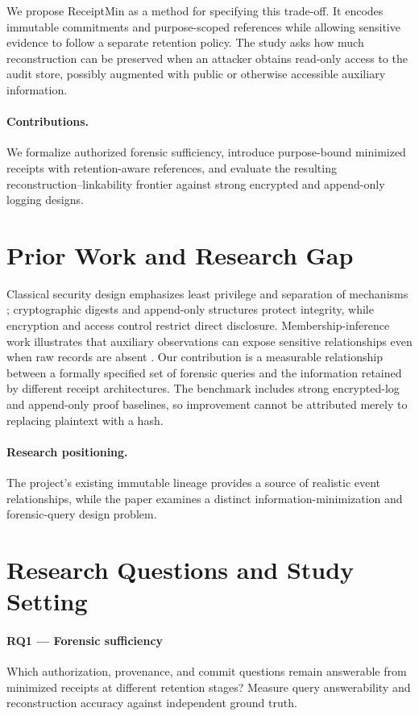 \documentclass[11pt,a4paper]{article}
\begin{document}
We propose ReceiptMin as a method for specifying this trade-off. It encodes immutable commitments and purpose-scoped references while allowing sensitive evidence to follow a separate retention policy. The study asks how much reconstruction can be preserved when an attacker obtains read-only access to the audit store, possibly augmented with public or otherwise accessible auxiliary information.

\paragraph{Contributions.} We formalize authorized forensic sufficiency, introduce purpose-bound minimized receipts with retention-aware references, and evaluate the resulting reconstruction--linkability frontier against strong encrypted and append-only logging designs.

\section{Prior Work and Research Gap}
Classical security design emphasizes least privilege and separation of mechanisms \cite{saltzer1975}; cryptographic digests and append-only structures protect integrity, while encryption and access control restrict direct disclosure. Membership-inference work illustrates that auxiliary observations can expose sensitive relationships even when raw records are absent \cite{shokri2017}. Our contribution is a measurable relationship between a formally specified set of forensic queries and the information retained by different receipt architectures. The benchmark includes strong encrypted-log and append-only proof baselines, so improvement cannot be attributed merely to replacing plaintext with a hash.

\paragraph{Research positioning.} The project’s existing immutable lineage provides a source of realistic event relationships, while the paper examines a distinct information-minimization and forensic-query design problem.

\section{Research Questions and Study Setting}
\paragraph{RQ1 — Forensic sufficiency} Which authorization, provenance, and commit questions remain answerable from minimized receipts at different retention stages? Measure query answerability and reconstruction accuracy against independent ground truth.
\end{document}
